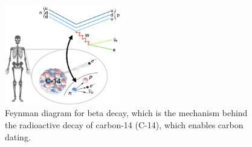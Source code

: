 \begin{figure}[htb]
    \centering
    \includegraphics[width=0.45\textwidth]{fig/feynman/beta_decay.png}
    \caption{
        Feynman diagram for beta decay, which is the mechanism behind the radioactive decay of carbon-14 (C-14), which enables carbon dating. 
    }
    \label{fig:beta_decay}
\end{figure}

